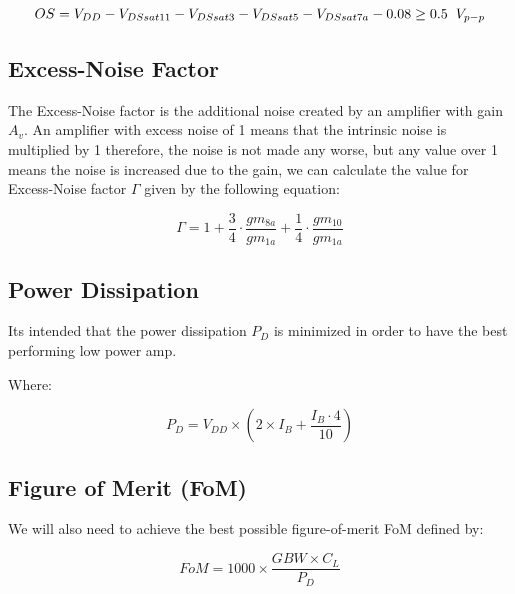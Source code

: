 $$OS = V_{DD} - V_{DSsat11} - V_{DSsat3} - V_{DSsat5} - V_{DSsat7a} - 0.08  \geq  0.5 \hspace{0.2cm} V_{p-p}$$

\subsection{Excess-Noise Factor}
The Excess-Noise factor is the additional noise created by an amplifier with gain $A_v$. An amplifier with excess noise of 1 means that the intrinsic noise is multiplied by 1 therefore, the noise is not made any worse, but any value over 1 means the noise is increased due to the gain, we can calculate the value for Excess-Noise factor $\Gamma$ given by the following equation:

$$\Gamma = 1 + \frac{3}{4}\cdot \frac{gm_{8a}}{gm_{1a}} + \frac{1}{4}\cdot \frac{gm_{10}}{gm_{1a}}$$

\subsection{Power Dissipation}

Its intended that the power dissipation $P_D$ is minimized in order to have the best performing low power amp.

Where: 

$$P_D = V_{DD} \times \left(2 \times I_B + \dfrac{I_B\cdot 4}{10}\right) $$

\subsection{Figure of Merit (FoM)}
 We will also need to achieve the best possible figure-of-merit FoM defined by: 

$$FoM = 1000 \times \dfrac{GBW \times C_L}{P_D}$$
